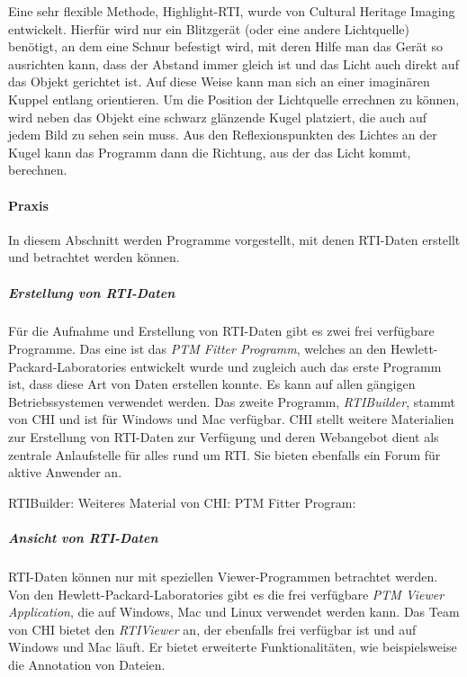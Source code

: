 Eine sehr flexible Methode, Highlight-RTI, wurde von Cultural Heritage Imaging entwickelt. Hierfür wird nur ein Blitzgerät (oder eine andere Lichtquelle) benötigt, an dem eine Schnur befestigt wird, mit deren Hilfe man das Gerät so ausrichten kann, dass der Abstand immer gleich ist und das Licht auch direkt auf das Objekt gerichtet ist. Auf diese Weise kann man sich an einer imaginären Kuppel entlang orientieren. Um die Position der Lichtquelle errechnen zu können, wird neben das Objekt eine schwarz glänzende Kugel platziert, die auch auf jedem Bild zu sehen sein muss. Aus den Reflexionspunkten des Lichtes an der Kugel kann das Programm dann die Richtung, aus der das Licht kommt, berechnen.


\paragraph{Praxis} In diesem Abschnitt werden Programme vorgestellt, mit denen RTI-Daten erstellt und betrachtet werden können.

\subparagraph{Erstellung von RTI-Daten}
Für die Aufnahme und Erstellung von RTI-Daten gibt es zwei frei verfügbare Programme. Das eine ist das \emph{PTM Fitter Programm}, welches an den Hewlett-Packard-Laboratories entwickelt wurde und zugleich auch das erste Programm ist, dass diese Art von Daten erstellen konnte. Es kann auf allen gängigen Betriebssystemen verwendet werden. Das zweite Programm, \emph{RTIBuilder}, stammt von CHI und ist für Windows und Mac verfügbar. CHI stellt weitere Materialien zur Erstellung von RTI-Daten zur Verfügung und deren Webangebot dient als zentrale Anlaufstelle für alles rund um RTI. Sie bieten ebenfalls ein Forum für aktive Anwender an.

\begin{flushleft}
	RTIBuilder: 
	Weiteres Material von CHI: 
	PTM Fitter Program: 
\end{flushleft}
	
	
\subparagraph{Ansicht von RTI-Daten}
RTI-Daten können nur mit speziellen Viewer-Programmen betrachtet werden. Von den Hewlett-Packard-Laboratories gibt es die frei verfügbare \emph{PTM Viewer Application}, die auf Windows, Mac und Linux verwendet werden kann. Das Team von CHI bietet den \emph{RTIViewer} an, der ebenfalls frei verfügbar ist und auf Windows und Mac läuft. Er bietet erweiterte Funktionalitäten, wie beispielsweise die Annotation von Dateien.

